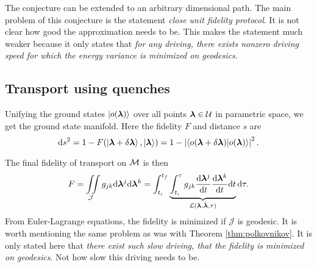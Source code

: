 The conjecture can be extended to an arbitrary dimensional path. The main problem of this conjecture is the statement \emph{close unit fidelity protocol}. It is not clear how good the approximation needs to be. This makes the statement much weaker because it only states that \emph{for any driving, there exists nonzero driving speed for which the energy variance is minimized on geodesics.}









\subsection{Transport using quenches}
\label{sec:quenches}
Unifying the ground states $\ket{o({\bm\lambda})}$ over all points ${\bm\lambda}\in\mathcal U$ in parametric space, we get the ground state manifold. Here the fidelity $F$ and distance $s$ are
\begin{equation}
    \mathrm{d} s^2 = 1-F(\ket{{\bm\lambda}+\delta{\bm\lambda}},\ket{{\bm\lambda}}) = 1-\left|\braket{o(\bm{{\bm\lambda}}+\delta\bm{{\bm\lambda}})|o(\bm{{\bm\lambda}})}\right|^2.
    \label{eq:distanceOnM0_1}
\end{equation}

The final fidelity of transport on $\mathcal{M}$ is then
\begin{equation}
    F=\iint\limits_{\mathcal J} g_{jk}\mathrm{d}{\bm\lambda}^j\mathrm{d}{\bm\lambda}^k = \int_{t_i}^{t_f}\underbrace{\int_{t_i}^\tau g_{jk}\frac{\mathrm{d} {\bm\lambda}^j}{\mathrm{d} t}\frac{\mathrm{d} {\bm\lambda}^k}{\mathrm{d} t} \mathrm{d} t}_{\mathcal{L}({\bm\lambda},\dot{{\bm\lambda}},\tau)}\mathrm{d} \tau .
\end{equation}
From Euler-Lagrange equations, the fidelity is minimized if $\mathcal J$ is geodesic. It is worth mentioning the same problem as was with Theorem \ref{thm:polkovnikov}. It is only stated here that \emph{there exist such slow driving, that the fidelity is minimized on geodesics}. Not how slow this driving needs to be. 

